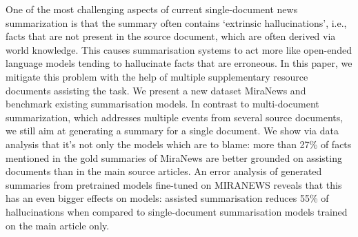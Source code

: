 One of the most challenging aspects of current single-document news summarization is that the summary often contains `extrinsic hallucinations', i.e., facts that are not present in the source document, which are often derived via world knowledge. This causes summarisation systems to act more like open-ended language models tending to hallucinate facts that are erroneous. In this paper, we mitigate this problem with the help of multiple supplementary resource documents assisting the task. We present a new dataset MiraNews and benchmark existing summarisation models. In contrast to multi-document summarization, which addresses multiple events from several source documents, we still aim at generating a summary for a single document. We show via data analysis that it's not only the models which are to blame: more than 27\% of facts mentioned in the gold summaries of MiraNews are better grounded on assisting documents than in the main source articles. An error analysis of generated summaries from pretrained models fine-tuned on MIRANEWS  reveals that this has an even bigger effects on models: assisted summarisation reduces 55\% of  hallucinations when compared to single-document summarisation models trained on the main article only.

